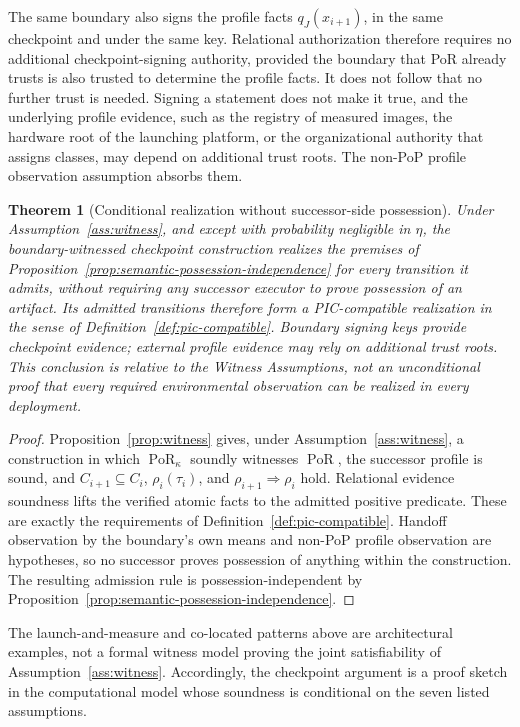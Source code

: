 \documentclass[10pt,twocolumn]{article}
\newcommand{\PoR}{\operatorname{PoR}}
\newtheorem{theorem}{Theorem}
\begin{document}
The same boundary also signs the profile facts \(q_J(x_{i+1})\), in the same
checkpoint and under the same key. Relational authorization therefore requires
no additional checkpoint-signing authority, provided the boundary that PoR
already trusts is also trusted to determine the profile facts. It does not
follow that no further trust is needed. Signing a statement does not make it
true, and the underlying profile evidence, such as the registry of measured
images, the hardware root of the launching platform, or the organizational
authority that assigns classes, may depend on additional trust roots. The
non-PoP profile observation assumption absorbs them.

\begin{theorem}[Conditional realization without successor-side possession]
\label{thm:possession-independence}
Under Assumption~\ref{ass:witness}, and except with probability negligible in
\(\eta\), the boundary-witnessed checkpoint construction realizes the premises
of Proposition~\ref{prop:semantic-possession-independence} for every transition
it admits, without requiring any successor executor to prove possession of an
artifact. Its admitted transitions therefore form a PIC-compatible realization
in the sense of Definition~\ref{def:pic-compatible}. Boundary signing keys
provide checkpoint evidence; external profile evidence may rely on additional
trust roots. This conclusion is relative to the Witness Assumptions, not an
unconditional proof that every required environmental observation can be
realized in every deployment.
\end{theorem}

\begin{proof}
Proposition~\ref{prop:witness} gives, under Assumption~\ref{ass:witness}, a
construction in which \(\PoR_\kappa\) soundly witnesses \(\PoR\), the successor
profile is sound, and \(C_{i+1}\subseteq C_i\), \(\rho_i(\tau_i)\), and
\(\rho_{i+1}\Rightarrow\rho_i\) hold. Relational evidence soundness lifts the
verified atomic facts to the admitted positive predicate. These are exactly the
requirements of Definition~\ref{def:pic-compatible}. Handoff observation by
the boundary's own means and non-PoP profile observation are hypotheses, so no
successor proves possession of anything within the construction. The resulting
admission rule is possession-independent by
Proposition~\ref{prop:semantic-possession-independence}.
\end{proof}

The launch-and-measure and co-located patterns above are architectural examples,
not a formal witness model proving the joint satisfiability of
Assumption~\ref{ass:witness}. Accordingly, the checkpoint argument is a proof
sketch in the computational model whose soundness is conditional on the seven
listed assumptions.
\end{document}
